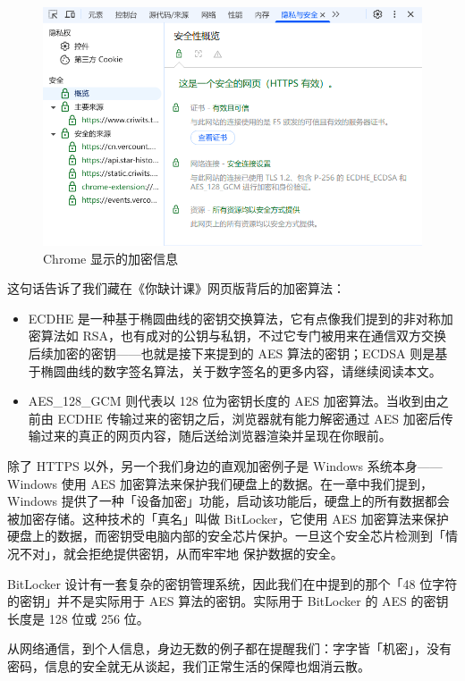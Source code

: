 \begin{figure}[htb!]
  \centering
  \includegraphics[width=.6\textwidth]{assets/surpass/HTTPS_in_criwits.png}
  \caption{Chrome 显示的加密信息}
  \label{fig:HTTPS_in_criwits}
\end{figure}

这句话告诉了我们藏在《你缺计课》网页版背后的加密算法：

\begin{itemize}
  \item ECDHE 是一种基于椭圆曲线的密钥交换算法，它有点像我们提到的非对称加密算法如 RSA，也有成对的公钥与私钥，不过它专门被用来在通信双方交换后续加密的密钥——也就是接下来提到的 AES 算法的密钥；ECDSA 则是基于椭圆曲线的数字签名算法，关于数字签名的更多内容，请继续阅读本文。
  \item AES\_{}128\_{}GCM 则代表以 128 位为密钥长度的 AES 加密算法。当收到由之前由 ECDHE 传输过来的密钥之后，浏览器就有能力解密通过 AES 加密后传输过来的真正的网页内容，随后送给浏览器渲染并呈现在你眼前。
\end{itemize}

除了 HTTPS 以外，另一个我们身边的直观加密例子是 Windows 系统本身——Windows 使用 AES 加密算法来保护我们硬盘上的数据。在一章中我们提到，Windows 提供了一种「设备加密」功能，启动该功能后，硬盘上的所有数据都会被加密存储。这种技术的「真名」叫做 BitLocker，它使用 AES 加密算法来保护硬盘上的数据，而密钥受电脑内部的安全芯片保护。一旦这个安全芯片检测到「情况不对」，就会拒绝提供密钥，从而牢牢地  保护数据的安全。

\begin{note}
  BitLocker 设计有一套复杂的密钥管理系统，因此我们在中提到的那个「48 位字符的密钥」并不是实际用于 AES 算法的密钥。实际用于 BitLocker 的 AES 的密钥长度是 128 位或 256 位。
\end{note}

从网络通信，到个人信息，身边无数的例子都在提醒我们：字字皆「机密」，没有密码，信息的安全就无从谈起，我们正常生活的保障也烟消云散。

